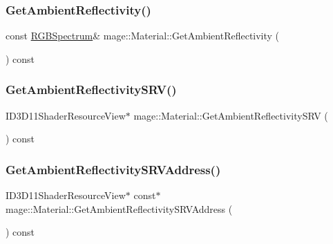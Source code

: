 \hypertarget{structmage_1_1_material_ad13afcccbb9b73cddd23a8586e77136e}{}\label{structmage_1_1_material_ad13afcccbb9b73cddd23a8586e77136e} 
\subsubsection{\texorpdfstring{Get\+Ambient\+Reflectivity()}{GetAmbientReflectivity()}\hspace{0.1cm}{\footnotesize\ttfamily [2/2]}}
{\footnotesize\ttfamily const \hyperlink{structmage_1_1_r_g_b_spectrum}{R\+G\+B\+Spectrum}\& mage\+::\+Material\+::\+Get\+Ambient\+Reflectivity (\begin{DoxyParamCaption}{ }\end{DoxyParamCaption}) const\hspace{0.3cm}{\ttfamily [noexcept]}}

\hypertarget{structmage_1_1_material_ab0d0618400f2eb7cefecfa5c6da2192b}{}\label{structmage_1_1_material_ab0d0618400f2eb7cefecfa5c6da2192b} 
\subsubsection{\texorpdfstring{Get\+Ambient\+Reflectivity\+S\+R\+V()}{GetAmbientReflectivitySRV()}}
{\footnotesize\ttfamily I\+D3\+D11\+Shader\+Resource\+View$\ast$ mage\+::\+Material\+::\+Get\+Ambient\+Reflectivity\+S\+RV (\begin{DoxyParamCaption}{ }\end{DoxyParamCaption}) const\hspace{0.3cm}{\ttfamily [noexcept]}}

\hypertarget{structmage_1_1_material_a52b0428fb9aeba97dcd8b5c7eb09836f}{}\label{structmage_1_1_material_a52b0428fb9aeba97dcd8b5c7eb09836f} 
\subsubsection{\texorpdfstring{Get\+Ambient\+Reflectivity\+S\+R\+V\+Address()}{GetAmbientReflectivitySRVAddress()}}
{\footnotesize\ttfamily I\+D3\+D11\+Shader\+Resource\+View$\ast$ const$\ast$ mage\+::\+Material\+::\+Get\+Ambient\+Reflectivity\+S\+R\+V\+Address (\begin{DoxyParamCaption}{ }\end{DoxyParamCaption}) const\hspace{0.3cm}{\ttfamily [noexcept]}}

